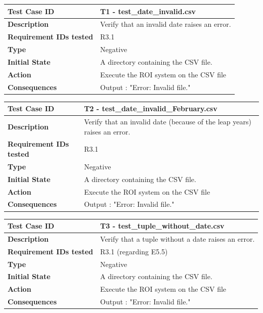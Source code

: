 \documentclass[runningheads,12pt]{article}
\begin{document}
\bigskip
{\centering
\begin{tabular}{|p{1.2in}|p{4in}|}
\hline
\textbf{Test Case ID} & T1 - test\_date\_invalid.csv \\ 
\hline
\textbf{Description} & Verify that an invalid date raises an error.\\
\hline
\textbf{Requirement IDs tested} & R3.1 \\ 
\hline
\textbf{Type} & Negative \\ 
\hline
\textbf{Initial State} & A directory containing the CSV file.\\
\hline 
\textbf{Action} & Execute the ROI system on the CSV file \\
\hline 
\textbf{Consequences} & Output : "Error: Invalid file." \\ 
\hline
\end{tabular}
\bigskip
\centering
\begin{tabular}{|p{1.2in}|p{4in}|}
\hline
\textbf{Test Case ID} & T2 - test\_date\_invalid\_February.csv \\ 
\hline
\textbf{Description} & Verify that an invalid date (because of the leap years) raises an error.\\
\hline
\textbf{Requirement IDs tested} & R3.1 \\ 
\hline
\textbf{Type} & Negative \\ 
\hline
\textbf{Initial State} & A directory containing the CSV file.\\
\hline 
\textbf{Action} & Execute the ROI system on the CSV file \\
\hline 
\textbf{Consequences} & Output : "Error: Invalid file." \\ 
\hline
\end{tabular}
\bigskip
\centering
\begin{tabular}{|p{1.2in}|p{4in}|}
\hline
\textbf{Test Case ID} & T3 - test\_tuple\_without\_date.csv \\ 
\hline
\textbf{Description} & Verify that a tuple without a date raises an error.\\
\hline
\textbf{Requirement IDs tested} & R3.1 (regarding E5.5) \\ 
\hline
\textbf{Type} & Negative \\ 
\hline
\textbf{Initial State} & A directory containing the CSV file.\\
\hline 
\textbf{Action} & Execute the ROI system on the CSV file \\
\hline 
\textbf{Consequences} & Output : "Error: Invalid file." \\ 

\end{tabular}}
\end{document}

